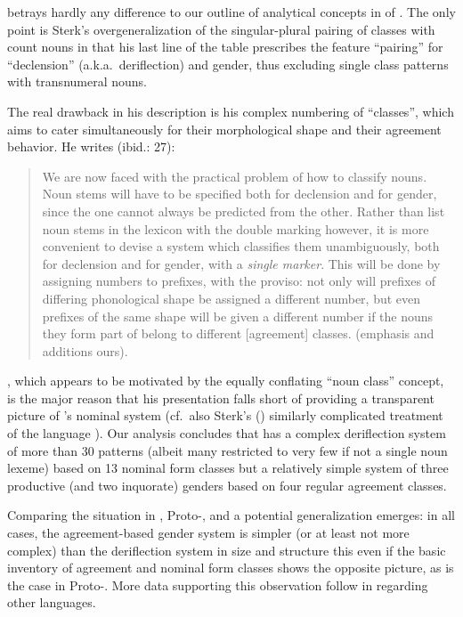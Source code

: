 \documentclass[output=collectionpaper]{langsci/langscibook}
\begin{document}
\largerpage
{} betrays hardly any difference to our outline of analytical concepts in  of . The only point is Sterk's overgeneralization of the singular-plural pairing of classes with count nouns in that his last line of the table prescribes the feature ``pairing'' for ``declension'' (a.k.a.\ deriflection) and gender, thus excluding single class patterns with transnumeral nouns.

The real drawback in his description is his complex numbering of ``classes'', which aims to cater simultaneously for their morphological shape and their agreement behavior. He writes (ibid.: 27):


\begin{quote}
We are now faced with the practical problem of how to classify  nouns. Noun stems will have to be specified both for declension and for gender, since the one cannot always be predicted from the other. Rather than list noun stems in the lexicon with the double marking however, it is more convenient to devise a system which classifies them unambiguously, both for declension and for gender, with a \emph{single marker}. This will be done by assigning numbers to prefixes, with the proviso: not only will prefixes of differing phonological shape be assigned a different number, but even prefixes of the same shape will be given a different number if the nouns they form part of belong to different [agreement] classes. (emphasis and additions ours).
\end{quote}


, which appears to be motivated by the equally conflating ``noun class'' concept, is the major reason that his presentation falls short of providing a transparent picture of 's nominal system (cf.\ also Sterk's (\citeyear{Sterk1976}) similarly complicated treatment of the  language ). Our analysis concludes that  has a complex deriflection system of more than 30 patterns (albeit many restricted to very few if not a single noun lexeme) based on 13 nominal form classes but a relatively simple system of three productive (and two inquorate) genders based on four regular agreement classes.

Comparing the situation in , Proto-, and  a potential generalization emerges: in all cases, the agreement-based gender system is simpler (or at least not more complex) than the deriflection system in size and structure \textendash{} this even if the basic inventory of agreement and nominal form classes shows the opposite picture, as is the case in Proto-. More data supporting this observation follow in  regarding other  languages.
\end{document}
